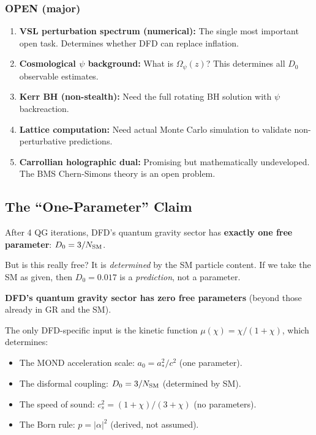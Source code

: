 \documentclass[11pt,a4paper]{article}
\begin{document}
\subsubsection{OPEN (major)}

\begin{enumerate}
\item \textbf{VSL perturbation spectrum (numerical):} The single most important open task. Determines whether DFD can replace inflation.

\item \textbf{Cosmological $\psi$ background:} What is $\Omega_\psi(z)$? This determines all $D_0$ observable estimates.

\item \textbf{Kerr BH (non-stealth):} Need the full rotating BH solution with $\psi$ backreaction.

\item \textbf{Lattice computation:} Need actual Monte Carlo simulation to validate non-perturbative predictions.

\item \textbf{Carrollian holographic dual:} Promising but mathematically undeveloped. The BMS Chern-Simons theory is an open problem.
\end{enumerate}

\subsection{The ``One-Parameter'' Claim}

After 4 QG iterations, DFD's quantum gravity sector has \textbf{exactly one free parameter}: $D_0 = 3/N_{\rm SM}$.

But is this really free? It is \emph{determined} by the SM particle content. If we take the SM as given, then $D_0 = 0.017$ is a \emph{prediction}, not a parameter.

\textbf{DFD's quantum gravity sector has zero free parameters} (beyond those already in GR and the SM).

The only DFD-specific input is the kinetic function $\mu(\chi) = \chi/(1+\chi)$, which determines:
\begin{itemize}
\item The MOND acceleration scale: $a_0 = a_*^2/c^2$ (one parameter).
\item The disformal coupling: $D_0 = 3/N_{\rm SM}$ (determined by SM).
\item The speed of sound: $c_s^2 = (1+\chi)/(3+\chi)$ (no parameters).
\item The Born rule: $p = |\alpha|^2$ (derived, not assumed).
\end{itemize}
\end{document}
